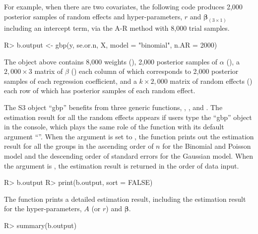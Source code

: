 \documentclass[article]{jss}
\begin{document}
For example, when there are two covariates, the following code produces 2,000 posterior samples of random effects and hyper-parameters, $r$ and $\boldsymbol{\beta}_{(3\times1)}$ including an intercept term, via the A-R method with 8,000 trial samples.
\begin{CodeChunk}
\begin{CodeInput}
R> b.output <- gbp(y, se.or.n, X, model = "binomial", n.AR = 2000)
\end{CodeInput}
\end{CodeChunk}

The object  above contains 8,000 weights (), 2,000 posterior samples of $\alpha$ (), a $2,000\times3$ matrix of $\beta$ ()  each column of which corresponds to 2,000 posterior samples of each regression coefficient, and a $k\times2,000$ matrix of random effects () each row of which has posterior samples of each random effect.



The S3 object ``gbp'' benefits from three generic functions, ,
, and . The estimation result for all the random
effects appears if users type the ``gbp'' object in the  console, which
plays the same role of the function  with its default argument
``''. When the argument  is set to , the
function  prints out the estimation result for all the groups in the
ascending order of $n$ for the Binomial and Poisson model and the descending
order of standard errors for the Gaussian model. When the argument 
is , the estimation result is returned in the order of data input.
\begin{CodeChunk}
\begin{CodeInput}
R> b.output
R> print(b.output, sort = FALSE)
\end{CodeInput}
\end{CodeChunk}

The function  prints a detailed estimation result, including the estimation result for the hyper-parameters, $A$ (or $r$) and $\boldsymbol{\beta}$.
\begin{CodeChunk}
\begin{CodeInput}
R> summary(b.output)
\end{CodeInput}
\end{CodeChunk}
\end{document}
